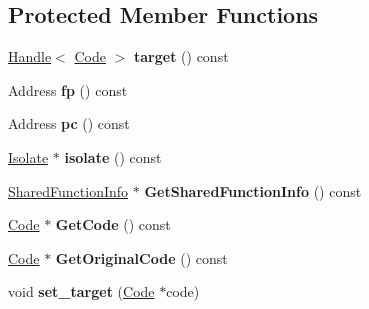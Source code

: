 \subsection*{Protected Member Functions}
\begin{DoxyCompactItemize}
\item 
\hypertarget{classv8_1_1internal_1_1_i_c_a983e3d7612413581b92aa90e061ef92d}{}\hyperlink{classv8_1_1internal_1_1_handle}{Handle}$<$ \hyperlink{classv8_1_1internal_1_1_code}{Code} $>$ {\bfseries target} () const \label{classv8_1_1internal_1_1_i_c_a983e3d7612413581b92aa90e061ef92d}

\item 
\hypertarget{classv8_1_1internal_1_1_i_c_a07c151e2ed2ae7fba51c663fbacc4e41}{}Address {\bfseries fp} () const \label{classv8_1_1internal_1_1_i_c_a07c151e2ed2ae7fba51c663fbacc4e41}

\item 
\hypertarget{classv8_1_1internal_1_1_i_c_a43827552cd6d3b5e7c919658a37877e1}{}Address {\bfseries pc} () const \label{classv8_1_1internal_1_1_i_c_a43827552cd6d3b5e7c919658a37877e1}

\item 
\hypertarget{classv8_1_1internal_1_1_i_c_ad57d9e6e622dff87dfb692234f585517}{}\hyperlink{classv8_1_1internal_1_1_isolate}{Isolate} $\ast$ {\bfseries isolate} () const \label{classv8_1_1internal_1_1_i_c_ad57d9e6e622dff87dfb692234f585517}

\item 
\hypertarget{classv8_1_1internal_1_1_i_c_a392fca27e8e46939631bc70d8433ed67}{}\hyperlink{classv8_1_1internal_1_1_shared_function_info}{Shared\+Function\+Info} $\ast$ {\bfseries Get\+Shared\+Function\+Info} () const \label{classv8_1_1internal_1_1_i_c_a392fca27e8e46939631bc70d8433ed67}

\item 
\hypertarget{classv8_1_1internal_1_1_i_c_acf0accf763cc814eb2e8d2fc8951daf8}{}\hyperlink{classv8_1_1internal_1_1_code}{Code} $\ast$ {\bfseries Get\+Code} () const \label{classv8_1_1internal_1_1_i_c_acf0accf763cc814eb2e8d2fc8951daf8}

\item 
\hypertarget{classv8_1_1internal_1_1_i_c_ae633a9ea222f7ae0d786ac0579b13248}{}\hyperlink{classv8_1_1internal_1_1_code}{Code} $\ast$ {\bfseries Get\+Original\+Code} () const \label{classv8_1_1internal_1_1_i_c_ae633a9ea222f7ae0d786ac0579b13248}

\item 
\hypertarget{classv8_1_1internal_1_1_i_c_ad68fe519b2f184f3a241d731051066e7}{}void {\bfseries set\+\_\+target} (\hyperlink{classv8_1_1internal_1_1_code}{Code} $\ast$code)\label{classv8_1_1internal_1_1_i_c_ad68fe519b2f184f3a241d731051066e7}


\end{DoxyCompactItemize}
